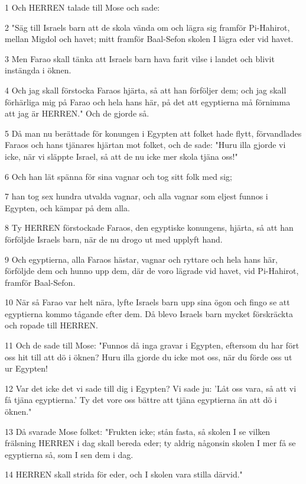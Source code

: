 \par 1 Och HERREN talade till Mose och sade:
\par 2 "Säg till Israels barn att de skola vända om och lägra sig framför Pi-Hahirot, mellan Migdol och havet; mitt framför Baal-Sefon skolen I lägra eder vid havet.
\par 3 Men Farao skall tänka att Israels barn hava farit vilse i landet och blivit instängda i öknen.
\par 4 Och jag skall förstocka Faraos hjärta, så att han förföljer dem; och jag skall förhärliga mig på Farao och hela hans här, på det att egyptierna må förnimma att jag är HERREN." Och de gjorde så.
\par 5 Då man nu berättade för konungen i Egypten att folket hade flytt, förvandlades Faraos och hans tjänares hjärtan mot folket, och de sade: "Huru illa gjorde vi icke, när vi släppte Israel, så att de nu icke mer skola tjäna oss!"
\par 6 Och han lät spänna för sina vagnar och tog sitt folk med sig;
\par 7 han tog sex hundra utvalda vagnar, och alla vagnar som eljest funnos i Egypten, och kämpar på dem alla.
\par 8 Ty HERREN förstockade Faraos, den egyptiske konungens, hjärta, så att han förföljde Israels barn, när de nu drogo ut med upplyft hand.
\par 9 Och egyptierna, alla Faraos hästar, vagnar och ryttare och hela hans här, förföljde dem och hunno upp dem, där de voro lägrade vid havet, vid Pi-Hahirot, framför Baal-Sefon.
\par 10 När så Farao var helt nära, lyfte Israels barn upp sina ögon och fingo se att egyptierna kommo tågande efter dem. Då blevo Israels barn mycket förskräckta och ropade till HERREN.
\par 11 Och de sade till Mose: "Funnos då inga gravar i Egypten, eftersom du har fört oss hit till att dö i öknen? Huru illa gjorde du icke mot oss, när du förde oss ut ur Egypten!
\par 12 Var det icke det vi sade till dig i Egypten? Vi sade ju: 'Låt oss vara, så att vi få tjäna egyptierna.' Ty det vore oss bättre att tjäna egyptierna än att dö i öknen."
\par 13 Då svarade Mose folket: "Frukten icke; stån fasta, så skolen I se vilken frälsning HERREN i dag skall bereda eder; ty aldrig någonsin skolen I mer få se egyptierna så, som I sen dem i dag.
\par 14 HERREN skall strida för eder, och I skolen vara stilla därvid."
